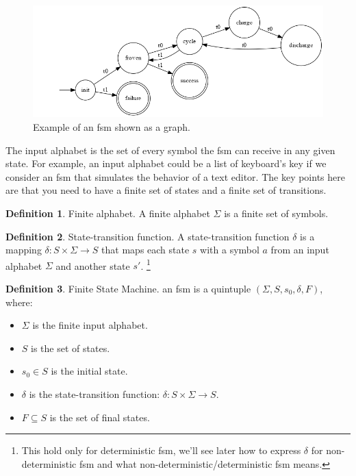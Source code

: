 \documentclass[12pt]{article}
\theoremstyle{definition}
\newtheorem{definition}{Definition}[section]
\theoremstyle{definition}
\theoremstyle{remark}
\begin{document}
\begin{figure}[H]
    \centering
    \includegraphics[scale=0.4]{graph/BatteryCycle.png}
    \caption{Example of an \gls{fsm} shown as a graph.}
    \label{battcycle}
\end{figure}

The input alphabet is the set of every symbol the \gls{fsm} can receive in any given state. For example, an input alphabet could be a list of keyboard's key if we consider an \gls{fsm} that simulates the behavior of a text editor. The key points here are that you need to have a finite set of states and a finite set of transitions.\\

\theoremstyle{definition}
\begin{definition}{Finite alphabet.} A finite alphabet $\Sigma$ is a finite set of symbols.
\end{definition}

\theoremstyle{definition}
\begin{definition}{State-transition function.} A state-transition function $\delta$ is a mapping $\delta:S\times \Sigma \rightarrow S$ that maps each state $s$ with a symbol $a$ from an input alphabet $\Sigma$ and another state $s'$.
\footnote{This hold only for deterministic \gls{fsm}, we'll see later how to express $\delta$ for non-deterministic \gls{fsm} and what non-deterministic/deterministic \gls{fsm} means.}
\end{definition}

\theoremstyle{definition}
\begin{definition}{Finite State Machine.} an \gls{fsm} is a quintuple $(\Sigma, S, s_{0},\delta, F)$, where:
\begin{itemize}
\item $\Sigma$ is the finite input alphabet.
\item $S$ is the set of states.
\item $s_{0} \in S$ is the initial state.
\item $\delta$ is the state-transition function: $\delta: S \times \Sigma \to S$.
\item $F \subseteq S$ is the set of final states.
\end{itemize}
\end{definition}
\end{document}
